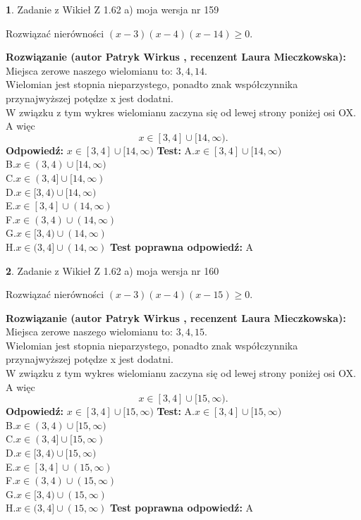 \documentclass[12pt, a4paper]{article}
\theoremstyle{definition} %
\newtheorem{zad}{}
\newcommand{\zadStart}[1]{\begin{zad}#1\newline}
\newcommand{\zadStop}{\end{zad}}
\newcommand{\rozwStart}[2]{\noindent \textbf{Rozwiązanie (autor #1 , recenzent #2): }\newline}
\newcommand{\rozwStop}{\newline}
\newcommand{\odpStart}{\noindent \textbf{Odpowiedź:}\newline}
\newcommand{\odpStop}{\newline}
\newcommand{\testStart}{\noindent \textbf{Test:}\newline}
\newcommand{\testStop}{\newline}
\newcommand{\kluczStart}{\noindent \textbf{Test poprawna odpowiedź:}\newline}
\newcommand{\kluczStop}{\newline}
\begin{document}
\zadStart{Zadanie z Wikieł Z 1.62 a) moja wersja nr 159}

Rozwiązać nierówności $(x-3)(x-4)(x-14)\ge0$.
\zadStop
\rozwStart{Patryk Wirkus}{Laura Mieczkowska}
Miejsca zerowe naszego wielomianu to: $3, 4, 14$.\\
Wielomian jest stopnia nieparzystego, ponadto znak współczynnika przy\linebreak najwyższej potędze x jest dodatni.\\ W związku z tym wykres wielomianu zaczyna się od lewej strony poniżej osi OX. A więc $$x \in [3,4] \cup [14,\infty).$$
\rozwStop
\odpStart
$x \in [3,4] \cup [14,\infty)$
\odpStop
\testStart
A.$x \in [3,4] \cup [14,\infty)$\\
B.$x \in (3,4) \cup [14,\infty)$\\
C.$x \in (3,4] \cup [14,\infty)$\\
D.$x \in [3,4) \cup [14,\infty)$\\
E.$x \in [3,4] \cup (14,\infty)$\\
F.$x \in (3,4) \cup (14,\infty)$\\
G.$x \in [3,4) \cup (14,\infty)$\\
H.$x \in (3,4] \cup (14,\infty)$
\testStop
\kluczStart
A
\kluczStop



\zadStart{Zadanie z Wikieł Z 1.62 a) moja wersja nr 160}

Rozwiązać nierówności $(x-3)(x-4)(x-15)\ge0$.
\zadStop
\rozwStart{Patryk Wirkus}{Laura Mieczkowska}
Miejsca zerowe naszego wielomianu to: $3, 4, 15$.\\
Wielomian jest stopnia nieparzystego, ponadto znak współczynnika przy\linebreak najwyższej potędze x jest dodatni.\\ W związku z tym wykres wielomianu zaczyna się od lewej strony poniżej osi OX. A więc $$x \in [3,4] \cup [15,\infty).$$
\rozwStop
\odpStart
$x \in [3,4] \cup [15,\infty)$
\odpStop
\testStart
A.$x \in [3,4] \cup [15,\infty)$\\
B.$x \in (3,4) \cup [15,\infty)$\\
C.$x \in (3,4] \cup [15,\infty)$\\
D.$x \in [3,4) \cup [15,\infty)$\\
E.$x \in [3,4] \cup (15,\infty)$\\
F.$x \in (3,4) \cup (15,\infty)$\\
G.$x \in [3,4) \cup (15,\infty)$\\
H.$x \in (3,4] \cup (15,\infty)$
\testStop
\kluczStart
A
\kluczStop
\end{document}
